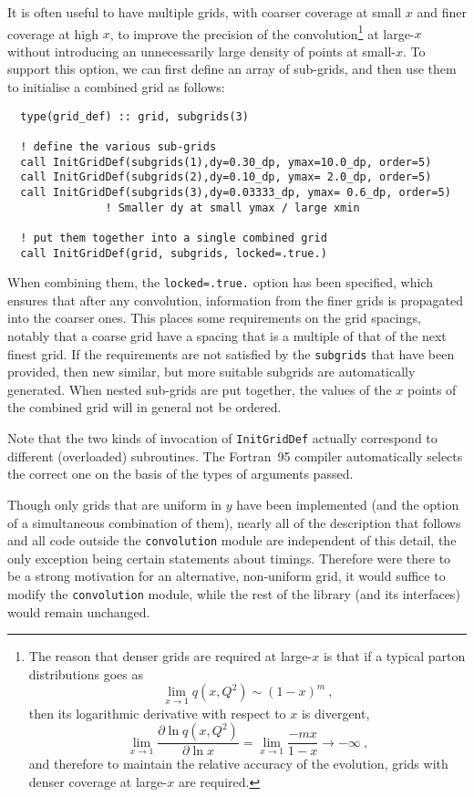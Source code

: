 \documentclass[12pt]{article}
\newcommand{\be}{\begin{equation}}
\newcommand{\ee}{\end{equation}}
\newcommand{\ttt}[1]{\texttt{#1}}
\begin{document}
It is often useful to have multiple grids, with
coarser coverage at small $x$ and finer coverage at high $x$, to
improve the precision of the convolution\footnote{
The reason that denser grids are required at large-$x$ is that
if a typical parton distributions goes as
\be
\lim_{x\to 1} q(x,Q^2) \sim (1-x)^m \ ,
\ee
then its logarithmic derivative with respect to $x$ is divergent,
\be
\lim_{x \to 1} \frac{\partial  \ln q(x,Q^2) }{\partial \ln x} = 
\lim_{x \to 1} \frac{-mx}{1-x} \to -\infty \ ,
\ee
and therefore to maintain the relative accuracy of the evolution, grids
with denser coverage at large-$x$ are required.} at large-$x$ without
introducing an unnecessarily large density of points
at small-$x$.
To support
this option, we can first define an array of sub-grids, and then use them to
initialise a combined grid as follows:
\begin{lstlisting}
  type(grid_def) :: grid, subgrids(3)

  ! define the various sub-grids
  call InitGridDef(subgrids(1),dy=0.30_dp, ymax=10.0_dp, order=5)
  call InitGridDef(subgrids(2),dy=0.10_dp, ymax= 2.0_dp, order=5)
  call InitGridDef(subgrids(3),dy=0.03333_dp, ymax= 0.6_dp, order=5) 
               ! Smaller dy at small ymax / large xmin 

  ! put them together into a single combined grid
  call InitGridDef(grid, subgrids, locked=.true.)
\end{lstlisting}
When combining them, the \ttt{locked=.true.} option has been specified,
which ensures that after any convolution, information from the finer
grids is propagated into the coarser ones. This places some
requirements on the grid spacings, notably that a coarse grid have a
spacing that is a multiple of that of the next finest grid. If the
requirements are not satisfied by the \ttt{subgrids} that have been
provided, then new similar, but more suitable subgrids are
automatically generated. When nested sub-grids are put together,
the values of the $x$ points of the combined grid will in general
not be ordered.

Note that the two kinds of invocation of \ttt{InitGridDef} actually
correspond to different (overloaded) subroutines. The Fortran~95 compiler
automatically selects the correct one on the basis of the types of
arguments passed.

Though only grids that are uniform in $y$ have been implemented
(and the option of a simultaneous combination of them),
nearly all of the description that follows and all code outside the
\texttt{convolution} module are independent of this detail, the only
exception being certain statements about timings. Therefore were
there to be a strong motivation for an alternative, non-uniform grid,
it would suffice to modify the \texttt{convolution} module, while the
rest of the library (and its interfaces) would remain unchanged.
\end{document}
